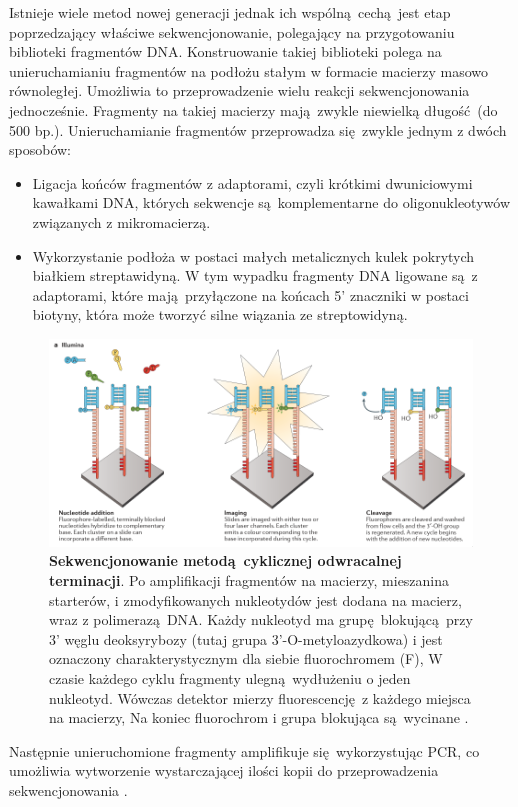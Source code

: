\documentclass[two column, twoside, a4paper]{article}
\begin{document}
Istnieje wiele metod nowej generacji jednak ich wspólną cechą jest etap poprzedzający właściwe sekwencjonowanie, polegający na przygotowaniu biblioteki fragmentów DNA. Konstruowanie takiej biblioteki polega na unieruchamianiu fragmentów na podłożu stałym w formacie macierzy masowo równoległej. Umożliwia to przeprowadzenie wielu reakcji sekwencjonowania jednocześnie. Fragmenty na takiej macierzy mają zwykle niewielką długość (do 500 bp.). Unieruchamianie fragmentów przeprowadza się zwykle jednym z dwóch sposobów:
\begin{itemize}
	\item Ligacja końców fragmentów z adaptorami, czyli krótkimi dwuniciowymi kawałkami DNA, których sekwencje są komplementarne do oligonukleotywów związanych z mikromacierzą.
	\item Wykorzystanie podłoża w postaci małych metalicznych kulek pokrytych białkiem streptawidyną. W tym wypadku fragmenty DNA ligowane są z adaptorami, które mają przyłączone na końcach 5' znaczniki w postaci biotyny, która może tworzyć silne wiązania ze streptowidyną.
\end{itemize}
\begin{figure}[btp]
	\begin{tcolorbox}
		\centering
		\includegraphics[width=\textwidth]{./figury/illumina.png}
		\caption{\textbf{Sekwencjonowanie metodą cyklicznej odwracalnej terminacji}. Po amplifikacji fragmentów na macierzy, mieszanina starterów, i zmodyfikowanych nukleotydów jest dodana na macierz, wraz z polimerazą DNA. Każdy nukleotyd ma grupę blokującą przy 3' węglu deoksyrybozy (tutaj grupa 3'-O-metyloazydkowa) i jest oznaczony charakterystycznym dla siebie fluorochromem (F),  W czasie każdego cyklu fragmenty ulegną wydłużeniu o jeden nukleotyd. Wówczas detektor mierzy fluorescencję z każdego miejsca na macierzy, Na koniec fluorochrom i grupa blokująca są wycinane \autocite{Godwin2016}.}\label{fig::illumina}
	\end{tcolorbox}
\end{figure}
Następnie unieruchomione fragmenty amplifikuje się wykorzystując PCR, co umożliwia wytworzenie wystarczającej ilości kopii do przeprowadzenia sekwencjonowania \autocite{Godwin2016}\autocite{Brown2019}.
\end{document}
